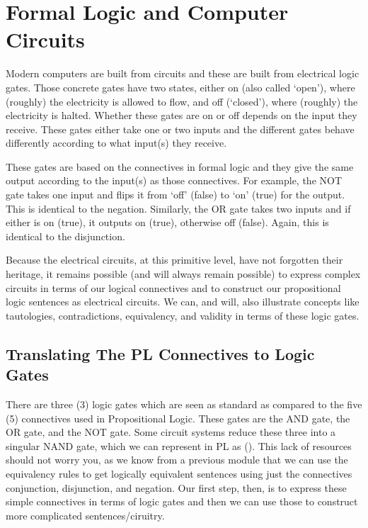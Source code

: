 \label{ch.logicgates}
\chapter{Formal Logic and Computer Circuits}
Modern computers are built from circuits and these are built from electrical logic gates. Those concrete gates have two states, either on (also called `open'), where (roughly) the electricity is allowed to flow, and off (`closed'), where (roughly) the electricity is halted. Whether these gates are on or off depends on the input they receive. These gates either take one or two inputs and the different gates behave differently according to what input(s) they receive. 

These gates are based on the connectives in formal logic and they give the same output according to the input(s) as those connectives. For example, the NOT gate takes one input and flips it from `off' (false) to `on' (true) for the output. This is identical to the negation. Similarly, the OR gate takes two inputs and if either is on (true), it outputs on (true), otherwise off (false). Again, this is identical to the disjunction. 

Because the electrical circuits, at this primitive level, have not forgotten their heritage, it remains possible (and will always remain possible) to express complex circuits in terms of our logical connectives and to construct our propositional logic sentences as electrical circuits. We can, and will, also illustrate concepts like tautologies, contradictions, equivalency, and validity in terms of these logic gates. 

\section{Translating The PL Connectives to Logic Gates}

There are three (3) logic gates which are seen as standard as compared to the five (5) connectives used in Propositional Logic. These gates are the AND gate, the OR gate, and the NOT gate. Some circuit systems reduce these three into a singular NAND gate, which we can represent in PL as \enot(\eand{}). This lack of resources should not worry you, as we know from a previous module that we can use the equivalency rules to get logically equivalent sentences using just the connectives conjunction, disjunction, and negation. Our first step, then, is to express these simple connectives in terms of logic gates and then we can use those to construct more complicated sentences/ciruitry.

